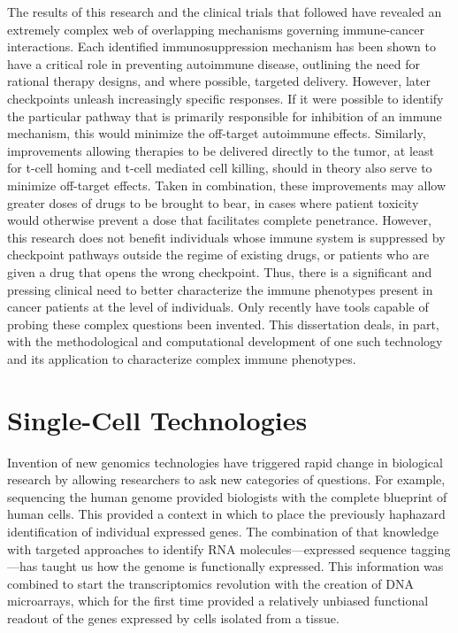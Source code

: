 The results of this research and the clinical trials that followed have revealed an extremely complex web of overlapping mechanisms governing immune-cancer interactions. 
Each identified immunosuppression mechanism has been shown to have a critical role in preventing autoimmune disease, outlining the need for rational therapy designs, and where possible, targeted delivery. 
However, later checkpoints unleash increasingly specific responses. 
If it were possible to identify the particular pathway that is primarily responsible for inhibition of an immune mechanism, this would minimize the off-target autoimmune effects. 
Similarly, improvements allowing therapies to be delivered directly to the tumor, at least for t-cell homing and t-cell mediated cell killing, should in theory also serve to minimize off-target effects. 
Taken in combination, these improvements may allow greater doses of drugs to be brought to bear, in cases where patient toxicity would otherwise prevent a dose that facilitates complete penetrance. 
However, this research does not benefit individuals whose immune system is suppressed by checkpoint pathways outside the regime of existing drugs, or patients who are given a drug that opens the wrong checkpoint. 
Thus, there is a significant and pressing clinical need to better characterize the immune phenotypes present in cancer patients at the level of individuals. 
Only recently have tools capable of probing these complex questions been invented.
This dissertation deals, in part, with the methodological and computational development of one such technology and its application to characterize complex immune phenotypes. 

\section{Single-Cell Technologies}

Invention of new genomics technologies have triggered rapid change in biological research by allowing researchers to ask new categories of questions. 
For example, sequencing the human genome provided biologists with the complete blueprint of human cells. 
This provided a context in which to place the previously haphazard identification of individual expressed genes. 
The combination of that knowledge with targeted approaches to identify RNA molecules---expressed sequence tagging---has taught us how the genome is functionally expressed. 
This information was combined to start the transcriptomics revolution with the creation of DNA microarrays, which for the first time provided a relatively unbiased functional readout of the genes expressed by cells isolated from a tissue. %


